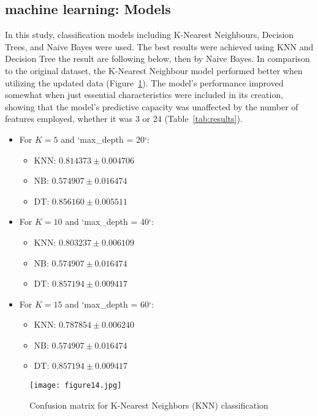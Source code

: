 \documentclass{article}
\begin{document}
\subsection{machine learning: Models}

In this study, classification models including K-Nearest Neighbours, Decision Trees, and Naive Bayes were used. The best results were achieved using KNN and Decision Tree the result are following below, then by Naive Bayes. In comparison to the original dataset, the K-Nearest Neighbour model performed better when utilizing the updated data (Figure~\ref{fig:figur14}). The model's performance improved somewhat when just essential characteristics were included in its creation, showing that the model's predictive capacity was unaffected by the number of features employed, whether it was 3 or 24 (Table~\ref{tab:results}).


\begin{itemize}
    \item For $K = 5$ and `max\_depth = 20`:
    \begin{itemize}
        \item KNN: $0.814373 \pm 0.004706$
        \item NB: $0.574907 \pm 0.016474$
        \item DT: $0.856160 \pm 0.005511$
    \end{itemize}

    \item For $K = 10$ and `max\_depth = 40`:
    \begin{itemize}
        \item KNN: $0.803237 \pm 0.006109$
        \item NB: $0.574907 \pm 0.016474$
        \item DT: $0.857194 \pm 0.009417$
    \end{itemize}

    \item For $K = 15$ and `max\_depth = 60`:
    \begin{itemize}
        \item KNN: $0.787854 \pm 0.006240$
        \item NB: $0.574907 \pm 0.016474$
        \item DT: $0.857194 \pm 0.009417$
    \end{itemize}
\end{itemize}


\begin{figure}[htbp]
    \centering
    \texttt{[image: figure14.jpg]}
    \caption{Confusion matrix for K-Nearest Neighbors (KNN) classification}
    \label{fig:figur14}
\end{figure}
\end{document}
